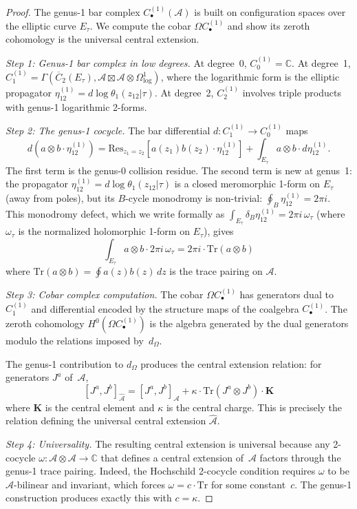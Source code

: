 \begin{proof}
The genus-1 bar complex $C_\bullet^{(1)}(\mathcal{A})$ is built on configuration spaces over the elliptic curve $E_\tau$.  We compute the cobar $\Omega C_\bullet^{(1)}$ and show its zeroth cohomology is the universal central extension.

\emph{Step 1: Genus-1 bar complex in low degrees.}
At degree~0, $C_0^{(1)} = \mathbb{C}$.  At degree~1, $C_1^{(1)} = \Gamma(\overline{C}_2(E_\tau), \mathcal{A} \boxtimes \mathcal{A} \otimes \Omega^1_{\log})$, where the logarithmic form is the elliptic propagator $\eta_{12}^{(1)} = d\log\theta_1(z_{12}|\tau)$.  At degree~2, $C_2^{(1)}$ involves triple products with genus-1 logarithmic 2-forms.

\emph{Step 2: The genus-1 cocycle.}
The bar differential $d: C_1^{(1)} \to C_0^{(1)}$ maps
\[
d(a \otimes b \cdot \eta_{12}^{(1)}) = \mathrm{Res}_{z_1=z_2}[a(z_1)b(z_2) \cdot \eta_{12}^{(1)}] + \int_{E_\tau} a \otimes b \cdot d\eta_{12}^{(1)}.
\]
The first term is the genus-0 collision residue.  The second term is new at genus~1: the propagator $\eta_{12}^{(1)} = d\log\theta_1(z_{12}|\tau)$ is a closed meromorphic 1-form on $E_\tau$ (away from poles), but its $B$-cycle monodromy is non-trivial: $\oint_B \eta_{12}^{(1)} = 2\pi i$.  This monodromy defect, which we write formally as $\int_{E_\tau} \delta_B \eta_{12}^{(1)} = 2\pi i\, \omega_\tau$ (where $\omega_\tau$ is the normalized holomorphic 1-form on $E_\tau$), gives
\[
\int_{E_\tau} a \otimes b \cdot 2\pi i\, \omega_\tau = 2\pi i \cdot \mathrm{Tr}(a \otimes b)
\]
where $\mathrm{Tr}(a \otimes b) = \oint a(z)b(z)\, dz$ is the trace pairing on $\mathcal{A}$.

\emph{Step 3: Cobar complex computation.}
The cobar $\Omega C_\bullet^{(1)}$ has generators dual to $C_1^{(1)}$ and differential encoded by the structure maps of the coalgebra $C_\bullet^{(1)}$.  The zeroth cohomology $H^0(\Omega C_\bullet^{(1)})$ is the algebra generated by the dual generators modulo the relations imposed by~$d_\Omega$.

The genus-1 contribution to $d_\Omega$ produces the central extension relation: for generators $J^a$ of~$\mathcal{A}$,
\[
[J^a, J^b]_{\widehat{\mathcal{A}}} = [J^a, J^b]_{\mathcal{A}} + \kappa \cdot \mathrm{Tr}(J^a \otimes J^b) \cdot \mathbf{K}
\]
where $\mathbf{K}$ is the central element and $\kappa$ is the central charge.  This is precisely the relation defining the universal central extension $\widehat{\mathcal{A}}$.

\emph{Step 4: Universality.}
The resulting central extension is universal because any 2-cocycle $\omega: \mathcal{A} \otimes \mathcal{A} \to \mathbb{C}$ that defines a central extension of~$\mathcal{A}$ factors through the genus-1 trace pairing.  Indeed, the Hochschild 2-cocycle condition requires $\omega$ to be $\mathcal{A}$-bilinear and invariant, which forces $\omega = c \cdot \mathrm{Tr}$ for some constant~$c$.  The genus-1 construction produces exactly this with $c = \kappa$.
\end{proof}

